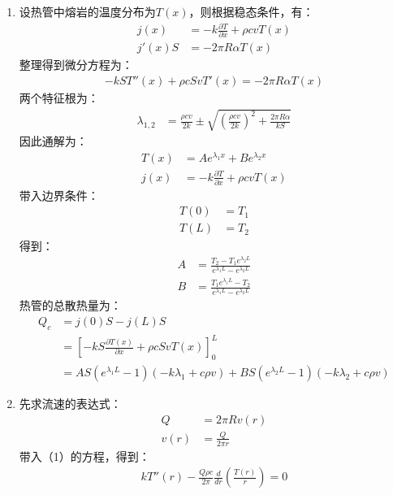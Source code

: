 \begin{enumerate}
	\item 设热管中熔岩的温度分布为\(T(x)\)，则根据稳态条件，有：
	\begin{align*}
		j(x) &= -k \frac{\partial T}{\partial x} + \rho c v T(x) \\
		j'(x)S &= -2\pi R \alpha T(x) 
	\end{align*}
	整理得到微分方程为：
	\begin{align*}
		-kS T''(x) + \rho cS v T'(x) = -2\pi R \alpha T(x)
	\end{align*}
	两个特征根为：
	\begin{align*}
		\lambda_{1,2} &= \frac{\rho c v}{2k} \pm \sqrt{(\frac{\rho c v}{2k})^2 + \frac{2\pi R \alpha}{kS}}
	\end{align*}
		因此通解为：
	\begin{align*}
		T(x) &= A e^{\lambda_1 x} + B e^{\lambda_2 x} \\
		j(x) &= -k \frac{\partial T}{\partial x} + \rho c v T(x)
	\end{align*}
	带入边界条件：
	\begin{align*}
		T(0) &= T_1 \\
		T(L) &= T_2
	\end{align*}
		得到：
	\begin{align*}
		A &= \frac{T_2 - T_1 e^{\lambda_2 L}}{e^{\lambda_1 L} - e^{\lambda_2 L}} \\
		B &= \frac{T_1 e^{\lambda_1 L} - T_2 }{e^{\lambda_1 L} - e^{\lambda_2 L}}
	\end{align*}
		热管的总散热量为：
	\begin{align*}
		Q_c &= j(0)S-j(L)S \\
		&= [-kS \frac{\partial T(x)}{\partial x} + \rho c Sv T(x)]_{0}^L \\
		&= AS(e^{\lambda_1 L} - 1)(-k\lambda_1+c\rho v) + BS(e^{\lambda_2 L} - 1)(-k\lambda_2+c\rho v) 
	\end{align*}
	\item 先求流速的表达式：
	\begin{align*}
		Q &= 2\pi R v(r) \\
		v(r) &= \frac{Q}{2\pi r}
	\end{align*}
	带入（1）的方程，得到：
	\begin{align*}
		 k T''(r) -  \frac{Q\rho c}{2\pi } \frac{d}{d r} (\frac{T(r)}{r})=0\\
	\end{align*}



\end{enumerate}